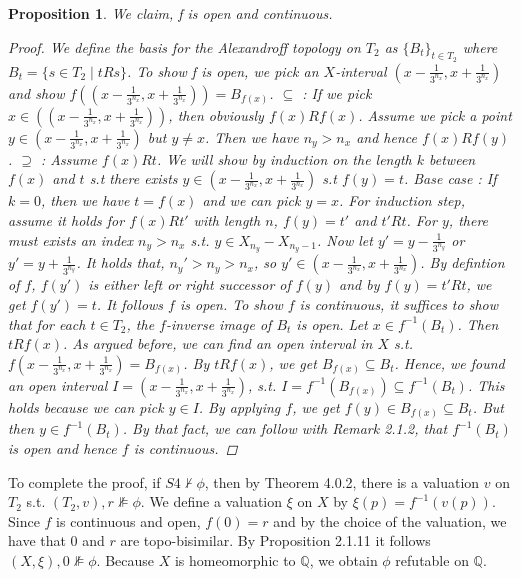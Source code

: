 \documentclass[12pt, a4paper]{scrartcl}
\newtheorem{proposition}[definition]{Proposition}
\begin{document}
\begin{proposition}
    We claim, f is open and continuous.

    \begin{proof}
        We define the basis for the Alexandroff topology on $T_2$ as $\{B_t\}_{t \in T_2}$ where $B_t = \{s \in T_2 \mid tRs\}$.
        To show f is open, we pick an $X$-interval $(x - \frac{1}{3^{n_x}}, x + \frac{1}{3^{n_x}})$ and show 
        $f((x - \frac{1}{3^{n_x}}, x + \frac{1}{3^{n_x}})) = B_{f(x)}$. \newline
        $\subseteq$ : If we pick $x \in ((x - \frac{1}{3^{n_x}}, x + \frac{1}{3^{n_x}}))$, then obviously $f(x)Rf(x)$. Assume we pick a point 
        $y \in (x - \frac{1}{3^{n_x}}, x + \frac{1}{3^{n_x}})$ but $y \neq x$. Then we have $n_y > n_x$ and hence $f(x) R f(y)$. \newline
        $\supseteq$ : Assume $f(x)Rt$. We will show by induction on the length $k$ between $f(x)$ and $t$ s.t there exists $y \in (x - \frac{1}{3^{n_x}}, x + \frac{1}{3^{n_x}})$ s.t $f(y) = t$.
        Base case : If $k = 0$, then we have $t = f(x)$ and we can pick $y = x$. For induction step, assume it holds for $f(x)Rt'$ with length $n$, $f(y) = t'$ and $t'Rt$.
        For $y$, there must exists an index $n_y > n_x$ s.t. $y \in X_{n_y} - X_{n_y -1}$. 
        Now let $y' = y - \frac{1}{3^{n_y}}$ or $y' = y + \frac{1}{3^{n_y}}$. It holds that, $n_y' > n_y > n_x$, so $y' \in (x - \frac{1}{3^{n_x}}, x + \frac{1}{3^{n_x}})$.
        By defintion of $f$, $f(y')$ is either left or right successor of $f(y)$ and by $f(y)= t' R t$, we get $f(y') = t$. It follows $f$ is open. \newline
        To show $f$ is continuous, it suffices to show that for each $t \in T_2$, the $f$-inverse image of $B_t$ is open. Let $x \in f^{-1}(B_t)$. Then $tRf(x)$. As argued before, we can find an open interval in $X$ s.t.
        $f (x - \frac{1}{3^{n_x}}, x + \frac{1}{3^{n_x}}) = B_{f(x)}$.  By $tRf(x)$, we get $B_{f(x)} \subseteq B_t$. Hence, we found an open interval
        $I = (x - \frac{1}{3^{n_x}}, x + \frac{1}{3^{n_x}})$, s.t. $I = f^{-1}(B_{f(x)}) \subseteq f^{-1}(B_t)$. This holds because we can pick $y \in I$. By applying $f$, we get $f(y) \in B_{f(x)} \subseteq B_t$. But then $y \in f^{-1}(B_t)$.
        By that fact, we can follow with Remark 2.1.2, that $f^{-1}(B_t)$ is open and hence $f$ is continuous.

    \end{proof}

\end{proposition}
To complete the proof, if $S4 \nvdash \phi$, then by Theorem 4.0.2, there is a valuation $v$ on $T_2$ s.t. $(T_2, v), r \nVDash \phi$. We define a valuation $\xi$ on $X$ by $\xi(p) = f^{-1}(v(p))$. Since $f$ is continuous and open, $f(0) = r$ and by the choice 
of the valuation, we have that $0$ and $r$ are topo-bisimilar. By Proposition 2.1.11 it follows $(X, \xi), 0 \nVDash \phi$. Because $X$ is homeomorphic to $\mathbb{Q}$, we obtain $\phi$ refutable on $\mathbb{Q}$.
\end{document}
